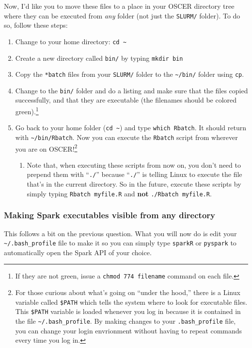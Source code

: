 \documentclass[12pt,english]{exam}
\begin{document}
\begin{questions}
Now, I'd like you to move these files to a place in your OSCER directory tree where they can be executed from \emph{any} folder (not just the \texttt{SLURM/} folder). To do so, follow these steps:
\begin{enumerate}
    \item Change to your home directory: \texttt{cd \textasciitilde}
    \item Create a new directory called \texttt{bin/} by typing \texttt{mkdir bin}
    \item Copy the \texttt{*batch} files from your \texttt{SLURM/} folder to the \texttt{\textasciitilde/bin/} folder using \texttt{cp}.
    \item Change to the \texttt{bin/} folder and do a listing and make sure that the files copied successfully, and that they are executable (the filenames should be colored green).\footnote{If they are not green, issue a \texttt{chmod 774 filename} command on each file.}
    \item Go back to your home folder (\texttt{cd \textasciitilde}) and type \texttt{which Rbatch}. It should return with \texttt{\textasciitilde/bin/Rbatch}. Now you can execute the \texttt{Rbatch} script from wherever you are on OSCER!\footnote{For those curious about what's going on ``under the hood,'' there is a Linux variable called \texttt{\$PATH} which tells the system where to look for executable files. This \texttt{\$PATH} variable is loaded whenever you log in because it is contained in the file \texttt{\textasciitilde/.bash\_profile}. By making changes to your \texttt{.bash\_profile} file, you can change your login envrionment without having to repeat commands every time you log in.}
    \begin{enumerate}
    \item Note that, when executing these scripts from now on, you don't need to prepend them with ``\texttt{./}'' because ``\texttt{./}'' is telling Linux to execute the file that's in the current directory. So in the future, execute these scripts by simply typing \texttt{Rbatch myfile.R} and \textbf{not} \texttt{./Rbatch myfile.R}.
    \end{enumerate}
\end{enumerate}

\subsubsection*{Making Spark executables visible from any directory}
\question This follows a bit on the previous question. What you will now do is edit your \texttt{\textasciitilde/.bash\_profile} file to make it so you can simply type \texttt{sparkR} or \texttt{pyspark} to automatically open the Spark API of your choice.


\end{questions}
\end{document}
